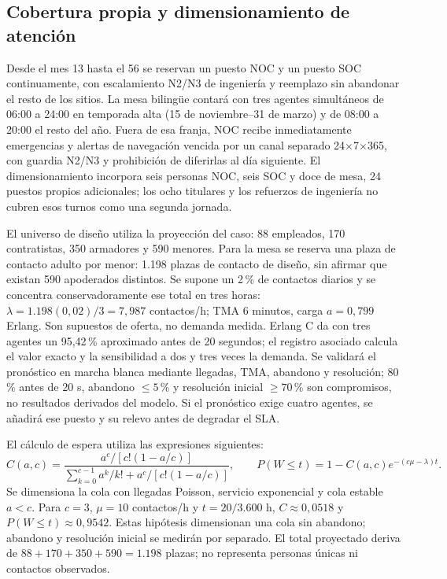 \subsection{Cobertura propia y dimensionamiento de atención}
Desde el mes 13 hasta el 56 se reservan un puesto NOC y un puesto SOC continuamente, con escalamiento N2/N3 de ingeniería y reemplazo sin abandonar el resto de los sitios. La mesa bilingüe contará con tres agentes simultáneos de 06:00 a 24:00 en temporada alta (15 de noviembre--31 de marzo) y de 08:00 a 20:00 el resto del año. Fuera de esa franja, NOC recibe inmediatamente emergencias y alertas de navegación vencida por un canal separado 24$\times$7$\times$365, con guardia N2/N3 y prohibición de diferirlas al día siguiente. El dimensionamiento incorpora seis personas NOC, seis SOC y doce de mesa, 24 puestos propios adicionales; los ocho titulares y los refuerzos de ingeniería no cubren esos turnos como una segunda jornada.

El universo de diseño utiliza la proyección del caso: 88 empleados, 170 contratistas, 350 armadores y 590 menores. Para la mesa se reserva una plaza de contacto adulto por menor: 1.198 plazas de contacto de diseño, sin afirmar que existan 590 apoderados distintos. Se supone un 2\,\% de contactos diarios y se concentra conservadoramente ese total en tres horas: $\lambda=1.198(0,02)/3=7,987$ contactos/h; TMA 6 minutos, carga $a=0,799$ Erlang. Son supuestos de oferta, no demanda medida. Erlang C da con tres agentes un 95,42\,\% aproximado antes de 20 segundos; el registro asociado calcula el valor exacto y la sensibilidad a dos y tres veces la demanda. Se validará el pronóstico en marcha blanca mediante llegadas, TMA, abandono y resolución; 80\,\% antes de 20 s, abandono $\leq5$\,\% y resolución inicial $\geq70$\,\% son compromisos, no resultados derivados del modelo. Si el pronóstico exige cuatro agentes, se añadirá ese puesto y su relevo antes de degradar el SLA.~\parencite[RT-21.06/14; pp.~35--38]{bases-transversales}~\parencite[cap.~14, p.~31; cap.~15, RT-21.06, p.~36]{caso07}

El cálculo de espera utiliza las expresiones siguientes:
\[
C(a,c)=\frac{a^c/[c!(1-a/c)]}{\sum_{k=0}^{c-1}a^k/k!+a^c/[c!(1-a/c)]},
\qquad P(W\leq t)=1-C(a,c)e^{-(c\mu-\lambda)t}.
\]
Se dimensiona la cola con llegadas Poisson, servicio exponencial y cola estable $a<c$. Para $c=3$, $\mu=10$ contactos/h y $t=20/3.600$ h, $C\approx0,0518$ y $P(W\leq t)\approx0,9542$. Estas hipótesis dimensionan una cola sin abandono; abandono y resolución inicial se medirán por separado. El total proyectado deriva de $88+170+350+590=1.198$ plazas; no representa personas únicas ni contactos observados.

